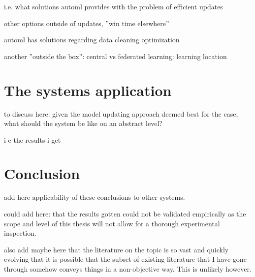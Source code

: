 i.e. what solutions automl provides with the problem of efficient updates

other options outside of updates, ''win time elsewhere''

automl has solutions regarding data cleaning optimization

another ''outside the box'': central vs federated learning: learning location

\chapter{The systems application}

to discuss here: given the model updating approach deemed best for the case, what should the system be like on an abstract level?

i e the results i get

\chapter{Conclusion}

add here applicability of these conclusions to other systems.

could add here: that the results gotten could not be validated empirically as the scope and level of this thesis will not allow for a thorough experimental inspection.

also add maybe here that the literature on the topic is so vast and quickly evolving that it is possible that the subset of existing literature that I have gone through somehow conveys things in a non-objective way. This is unlikely however.
